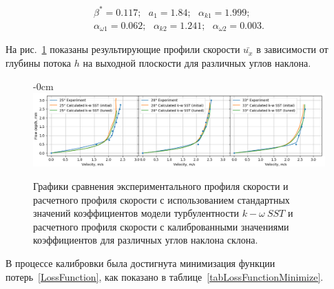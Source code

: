 \documentclass[mathematics,article,accept,pdftex,moreauthors]{Definitions/mdpi}
\begin{document}
\begin{linenomath}
\begin{equation}
	\begin{aligned}
		\beta^* = 0.117;\ \ \ a_1 = 1.84;\ \ \ \alpha_{k 1} = 1.999;\\
		\alpha_{\omega 1} = 0.062; \ \ \ \alpha_{k 2} = 1.241;\ \ \ \alpha_{\omega 2} = 0.003.
	\end{aligned}
\end{equation}
\end{linenomath}

На рис.~\ref{NIIMexUProfilesKWSSTGlob} показаны результирующие профили скорости $\bar{ {u_x}}$ в зависимости от глубины потока $h$ на выходной плоскости для различных углов наклона.

\begin{figure}[H]
\begin{adjustwidth}{-\extralength}{0cm}
\centering
\includegraphics[width=18 cm]{UProfilesKWSSTGlob1.png}
\end{adjustwidth}
\caption{Графики сравнения экспериментального профиля скорости и расчетного профиля скорости с использованием стандартных значений коэффициентов модели турбулентности $k-\omega\ SST$ и расчетного профиля скорости с калиброванными значениями коэффициентов для различных углов наклона склона.\label{NIIMexUProfilesKWSSTGlob}}
\end{figure}  

В процессе калибровки была достигнута минимизация функции потерь~\eqref{LossFunction}, как показано в таблице~\ref{tabLossFunctionMinimize}.
\end{document}
